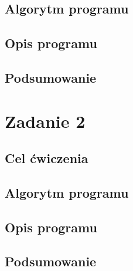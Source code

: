 \documentclass{article} %
\newcommand{\forceindent}{\leavevmode{\parindent=1cm\indent}} %
\begin{document}
			\lipsum[1-8][2-8]
		\subsection{Algorytm programu}	
			\forceindent\lipsum[1-8][2-8]	
		\subsection{Opis programu}
			\forceindent\lipsum[3-8][2-8]	
		\subsection{Podsumowanie}
			\forceindent\lipsum[1-8][2-8]	
	\section{Zadanie 2}
		\subsection{Cel ćwiczenia}
			\forceindent\lipsum[1-8][2-8]
		\subsection{Algorytm programu}
			\forceindent\lipsum[1-8][2-8]		
		\subsection{Opis programu}
			\forceindent\lipsum[1-8][1-18]	
		\subsection{Podsumowanie}
			\forceindent\lipsum[1-8][2-8]			
	
\end{document}
